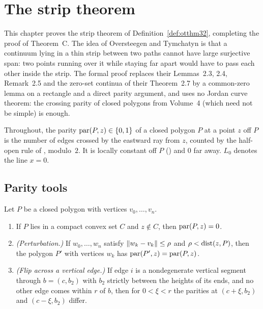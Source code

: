 \chapter{The strip theorem}\label{ch:strips}

This chapter proves the strip theorem of Definition~\ref{def:otthm32}, completing the proof of Theorem~C. The idea of
Oversteegen and Tymchatyn is that a continuum lying in a thin strip between two paths cannot have large surjective span: two
points running over it while staying far apart would have to pass each other inside the strip. The formal proof replaces their
Lemmas~2.3, 2.4, Remark~2.5 and the zero-set continua of their Theorem~2.7 by a common-zero lemma on a rectangle and a direct
parity argument, and uses no Jordan curve theorem: the crossing parity of closed polygons from Volume~4 (which need not be
simple) is enough.

Throughout, the parity $\operatorname{par}(P,z)\in\left\{ 0,1 \right\}$ of a closed polygon $P$ at a point $z$ off $P$ is the number of edges crossed by
the eastward ray from $z$, counted by the half-open rule of , modulo~$2$. It is locally constant off $P$
() and $0$ far away. $L_0$ denotes the line $x=0$.


\section{Parity tools}

\begin{lemma}\label{lem:parity-tools}
Let $P$ be a closed polygon with vertices $v_0,\dots,v_n$.
\begin{enumerate}[label=(\alph*)]
\item If $P$ lies in a compact convex set $C$ and $z\notin C$, then $\operatorname{par}(P,z)=0$.
\item \emph{(Perturbation.)} If $w_0,\dots,w_n$ satisfy $\lVert w_k-v_k\rVert\le\rho$ and $\rho<\operatorname{dist}(z,P)$, then the polygon $P'$ with vertices $w_k$ has
$\operatorname{par}(P',z)=\operatorname{par}(P,z)$.
\item \emph{(Flip across a vertical edge.)} If edge $i$ is a nondegenerate vertical segment through $b=(c,b_2)$ with $b_2$ strictly between the heights of its
ends, and no other edge comes within $r$ of $b$, then for $0<\xi<r$ the parities at $(c+\xi,b_2)$ and $(c-\xi,b_2)$ differ.
\end{enumerate}
\end{lemma}

